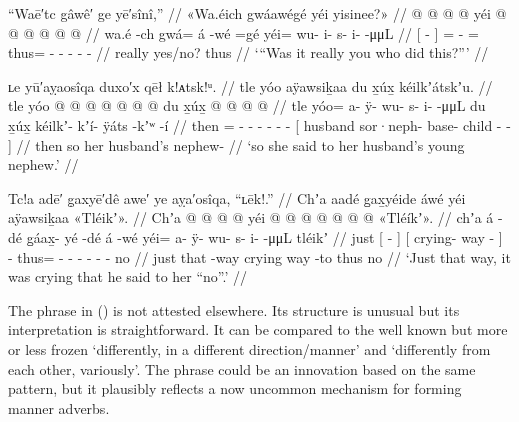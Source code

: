 \ex\label{ex:91-15-was-it-you}%
%
\begingl
	\glpreamble	“Waē′tc gâwê′ ge yē′sînî,” //
	\glpreamble	«\!Wa.éich gwáawégé yéi yisinee?\!» //
	\gla	{}  @ {} {}  @ {} @ {} @ {}
		yéi @  @ {} @ {} @ {} @ {} @ {} //
	\glb	{} wa.é -ch {} gwá= á -wé =gé
		yéi= wu- i- s- i-  -μμL //
	\glc	{}[  - {}] =  - =
		thus= - - - -  - //
	\gld	{}  {} {} really\•  {} \•yes/no?
		thus\•  {} {} {} {} {}  //
	\glft	‘“Was it really you who did this?”’
		//
\endgl
\xe

\ex\label{ex:91-16-so-she-said-to-him}%
%
\begingl
	\glpreamble	ʟe yū′aỵaosîqa duxo′x qēł k!ᴀtsk!ᵘ. //
	\glpreamble	tle yóo aÿawsiḵaa du x̱úx̱ kéilkʼátskʼu. //
	\gla	tle yóo @  @ {} @ {} @ {} @ {} @ {} @ {} 
		{} du x̱úx̱  @ {} @ {} @ {} @ {} {} //
	\glb	tle yóo= a- ÿ- wu- s- i-  -μμL
		{} du x̱úx̱ kéilkʼ- kʼí- ÿáts -kʼʷ -í {} //
	\glc	then = - - - - -  -
		{}[  husband sor·neph- base- child - - {}] //
	\gld	then so  {} {} {} {} {} {}
		{} her husband’s nephew-  {} {} {} {} //
	\glft	‘so she said to her husband’s young nephew.’
		//
\endgl
\xe

\ex\label{ex:91-17-crying-he-said-no}%
%
\begingl
	\glpreamble	Tc!a adē′ g̣axyē′dê awe′ ye aỵa′osîqa, “ʟēk!.” //
	\glpreamble	Chʼa aadé g̱ax̱yéide áwé yéi aÿawsiḵaa «\!Tléikʼ\!». //
	\gla	Chʼa {}  @ {} {}
		{}  @ {} @ {} {}  @ {}
		yéi @  @ {} @ {} @ {} @ {} @ {} @ {}
		«\!Tléíkʼ\!». //
	\glb	chʼa {} á -dé {}
		{} g̱áax̱- yé -dé {} á -wé
		yéi= a- ÿ- wu- s- i-  -μμL
		\pqp{}tléikʼ //
	\glc	just {}[  - {}]
		{}[ crying- way - {}]  -
		thus= - - - - -  -
		\pqp{}no //
	\gld	just {} that -way {}
		{} crying way -to {}  {}
		thus\•  {} {} {} {} {} {}
		\pqp{}no //
	\glft	‘Just that way, it was crying that he said to her “no”.’
		//
\endgl
\xe

The phrase  in (\lastx) is not attested elsewhere.
Its structure is unusual but its interpretation is straightforward.
It can be compared to the well known but more or less frozen  ‘differently, in a different direction/manner’ and  ‘differently from each other, variously’.
The phrase  could be an innovation based on the same pattern, but it plausibly reflects a now uncommon mechanism for forming manner adverbs.

